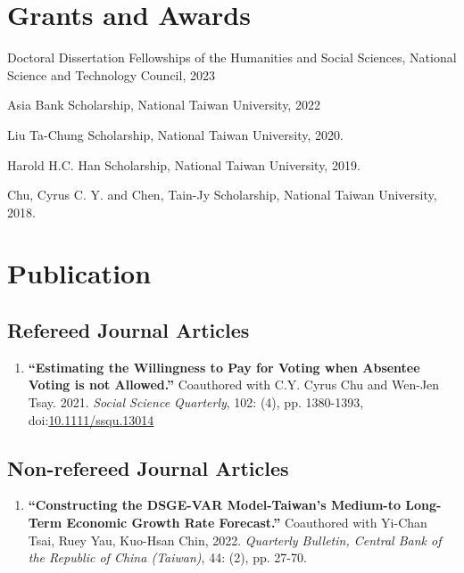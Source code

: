 \documentclass{article}
\newcommand{\cvsection}[1]{\section*{\rmfamily#1}}
\newcommand{\cvsubsection}[1]{\subsection*{\rmfamily\hspace{1.6em}#1}}
\begin{document}






\cvsection{Grants and Awards}
\indent

Doctoral Dissertation Fellowships of the Humanities and Social Sciences, National Science and Technology Council, 2023

Asia Bank Scholarship, National Taiwan University, 2022

Liu Ta-Chung Scholarship, National Taiwan University, 2020.

Harold H.C. Han Scholarship, National Taiwan University, 2019.

Chu, Cyrus C. Y. and Chen, Tain-Jy Scholarship, National Taiwan University, 2018.

\section*{Publication}

\cvsubsection{Refereed Journal Articles}

\begin{enumerate}[resume]
    \item \textbf{“Estimating the Willingness to Pay for Voting when Absentee Voting is not Allowed.”} Coauthored with C.Y. Cyrus Chu and Wen-Jen Tsay. 2021. \textit{Social Science Quarterly}, 102: (4), pp. 1380-1393,\\ doi:\href{https://doi.org/10.1111/ssqu.13014}{10.1111/ssqu.13014}
\end{enumerate}


\cvsubsection{Non-refereed Journal Articles}

\begin{enumerate}[resume]
    \item \textbf{“Constructing the DSGE-VAR Model-Taiwan's Medium-to Long-Term Economic Growth Rate Forecast.”} Coauthored with Yi-Chan Tsai, Ruey Yau, Kuo-Hsan Chin, 2022. \textit{Quarterly Bulletin, Central Bank of the Republic of China (Taiwan)}, 44: (2), pp. 27-70.
\end{enumerate}
\end{document}

